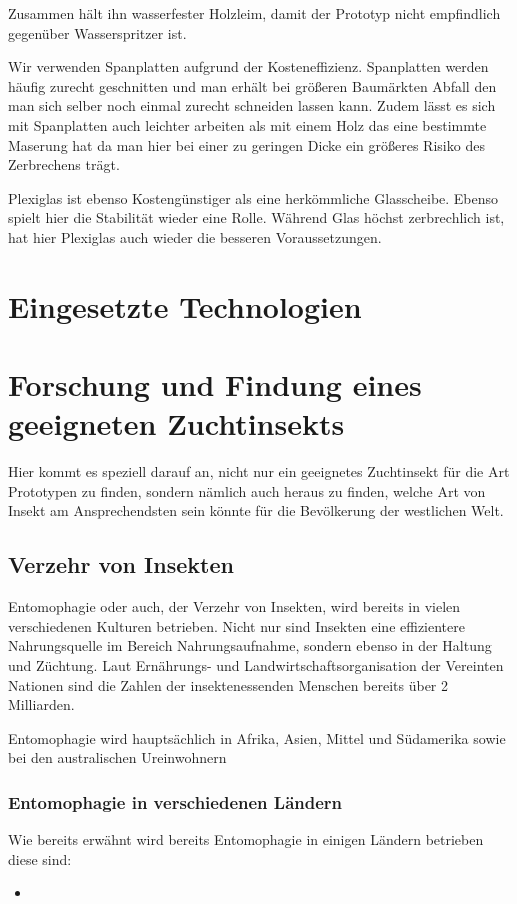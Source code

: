 Zusammen hält ihn wasserfester Holzleim, damit der Prototyp nicht empfindlich gegenüber Wasserspritzer ist. 

Wir verwenden Spanplatten aufgrund der Kosteneffizienz. Spanplatten werden häufig zurecht geschnitten und man erhält bei größeren Baumärkten Abfall den man sich selber noch einmal zurecht schneiden lassen kann. Zudem lässt es sich mit Spanplatten auch leichter arbeiten als mit einem Holz das eine bestimmte Maserung hat da man hier bei einer zu geringen Dicke ein größeres Risiko des Zerbrechens trägt.

Plexiglas ist ebenso Kostengünstiger als eine herkömmliche Glasscheibe. Ebenso spielt hier die Stabilität wieder eine Rolle. Während Glas höchst zerbrechlich ist, hat hier Plexiglas auch wieder die besseren Voraussetzungen.


\chapter{Eingesetzte Technologien} \label{sec:tech}






\def \currentAuthor{Leonid Hammer}
\chapter{Forschung und Findung eines geeigneten Zuchtinsekts}
Hier kommt es speziell darauf an, nicht nur ein geeignetes Zuchtinsekt für die Art Prototypen zu finden, sondern nämlich auch heraus zu finden, welche Art von Insekt am Ansprechendsten sein könnte für die Bevölkerung der westlichen Welt.

\section{Verzehr von Insekten}
Entomophagie oder auch, der Verzehr von Insekten, wird bereits in vielen verschiedenen Kulturen betrieben. Nicht nur sind Insekten eine effizientere Nahrungsquelle im Bereich Nahrungsaufnahme, sondern ebenso in der Haltung und Züchtung. Laut Ernährungs- und Landwirtschaftsorganisation der Vereinten Nationen sind die Zahlen der insektenessenden Menschen bereits über 2 Milliarden.

Entomophagie wird hauptsächlich in Afrika, Asien, Mittel und Südamerika sowie bei den australischen Ureinwohnern 

\subsection{Entomophagie in verschiedenen Ländern}
Wie bereits erwähnt wird bereits Entomophagie in einigen Ländern betrieben diese sind: 
\begin{itemize}
	\item 
\end{itemize}

